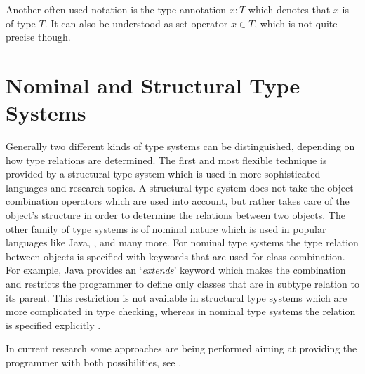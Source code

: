 \begin{mathpar}
\end{mathpar}

Another often used notation is the type annotation $x:T$ which denotes
that $x$ is of type $T$. It can also be understood as set operator
$x \in T$, which is not quite precise though.

\section{Nominal and Structural Type Systems}


Generally two different kinds of type systems can be distinguished,
depending on how type relations are determined. The first and most
flexible technique is provided by a structural type system which is
used in more sophisticated languages and research topics. A structural
type system does not take the object combination operators which are
used into account, but rather takes care of the object's structure in
order to determine the relations between two objects. The other family
of type systems is of nominal nature which is used in popular languages
like Java, \cs, \cpp and many more. For nominal type systems the type
relation between objects is specified with keywords that are used for
class combination. For example, Java provides an `\emph{extends}' keyword
which makes the combination and restricts the programmer to define only
classes that are in subtype relation to its parent. This restriction is
not available in structural type systems which are more complicated in
type checking, whereas in nominal type systems the relation is specified
explicitly \cite{malayeri_integrating_2008,pierce_types_2002}.

In current research some approaches are being performed aiming
at providing the programmer with both possibilities, see
\cite{findler_semantic_2004,gil_whiteoak:_2008,malayeri_integrating_2008}.

